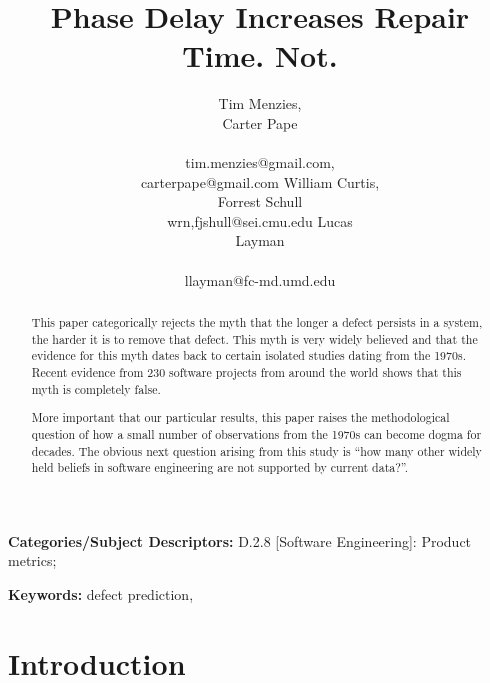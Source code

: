 \documentclass{sig-alternate}
\begin{document}
\title{Phase Delay Increases  Repair Time. Not.}
\author{
\alignauthor
Tim Menzies, \\Carter Pape\\
       \\
       tim.menzies@gmail.com,\\carterpape@gmail.com
\alignauthor
William Curtis,\\ Forrest Schull\\
wrn,fjshull@sei.cmu.edu
\alignauthor
Lucas \\Layman\\
       \\ 
       llayman@fc-md.umd.edu
} 


 
\maketitle
\begin{abstract}
This paper categorically rejects 
the myth that 
the longer a defect persists in a system, the harder
it is to remove that defect.  
This myth is very widely believed
and that the evidence for this myth dates back to certain
isolated studies dating from the 1970s. Recent evidence from
230 software projects from around the world shows that this
myth is completely false.

More important that our particular results, this paper
raises the methodological question of how a small number
of observations from the 1970s can become dogma for decades.
The obvious next question arising from this study is ``how
many other widely held beliefs in software engineering are
not supported by current data?''.
\end{abstract}

\vspace{1mm}
\noindent
{\bf Categories/Subject Descriptors:} 
D.2.8 [Software Engineering]: Product metrics; 

 

\vspace{1mm}
\noindent
{\bf Keywords:} defect prediction, 

\section{Introduction}
\end{document}
